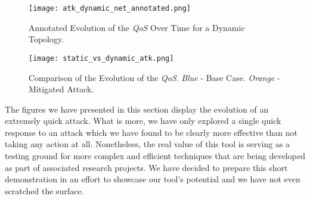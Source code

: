             \begin{sidewaysfigure}
                \centering
                \texttt{[image: atk\_dynamic\_net\_annotated.png]}
                \caption[Annotated \textit{QoS} on a Dynamic Topology]{Annotated Evolution of the \textit{QoS} Over Time for a Dynamic Topology.}
                \label{fig:dynamic-atk-annotated}
            \end{sidewaysfigure}

            \begin{sidewaysfigure}
                \centering
                \texttt{[image: static\_vs\_dynamic\_atk.png]}
                \caption[Attack Mitigation Effect vs. Baseline Case]{Comparison of the Evolution of the \textit{QoS}. \textit{Blue} - Base Case. \textit{Orange} - Mitigated Attack.}
                \label{fig:atk-comparison}
            \end{sidewaysfigure}

            

        The figures we have presented in this section display the evolution of an extremely quick attack. What is more, we have only explored a single quick response to an attack which we have found to be clearly more effective than not taking any action at all. Nonetheless, the real value of this tool is serving as a testing ground for more complex and efficient techniques that are being developed as part of associated research projects. We have decided to prepare this short demonstration in an effort to showcase our tool's potential and we have not even scratched the surface.\\
